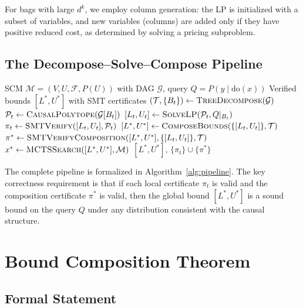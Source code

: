 \documentclass[11pt,a4paper]{article}
\newcommand{\doOp}{\mathrm{do}}
\newcommand{\calG}{\mathcal{G}}
\newcommand{\calM}{\mathcal{M}}
\newcommand{\calP}{\mathcal{P}}
\newcommand{\calT}{\mathcal{T}}
\begin{document}
For bags with large $d^k$, we employ column generation: the LP is initialized with a subset of variables, and new variables (columns) are added only if they have positive reduced cost, as determined by solving a pricing subproblem.

\subsection{The Decompose--Solve--Compose Pipeline}
\label{sec:pipeline}

\begin{algorithm}[t]
\caption{Decompose--Solve--Compose Pipeline}
\label{alg:pipeline}
\begin{algorithmic}[1]
\REQUIRE SCM $\calM = (V, U, \mathcal{F}, P(U))$ with DAG $\calG$, query $Q = P(y \mid \doOp(x))$
\ENSURE Verified bounds $[L^*, U^*]$ with SMT certificates
\STATE $(\calT, \{B_t\}) \leftarrow \textsc{TreeDecompose}(\calG)$
\FOR{each bag $B_t$ in $\calT$}
    \STATE $\calP_t \leftarrow \textsc{CausalPolytope}(\calG[B_t])$
    \STATE $[L_t, U_t] \leftarrow \textsc{SolveLP}(\calP_t, Q|_{B_t})$
    \STATE $\pi_t \leftarrow \textsc{SMTVerify}([L_t, U_t], \calP_t)$
\ENDFOR
\STATE $[L^*, U^*] \leftarrow \textsc{ComposeBounds}(\{[L_t, U_t]\}, \calT)$
\STATE $\pi^* \leftarrow \textsc{SMTVerifyComposition}([L^*, U^*], \{[L_t, U_t]\}, \calT)$
\STATE $x^* \leftarrow \textsc{MCTSSearch}([L^*, U^*], \calM)$
\RETURN $[L^*, U^*]$, $\{\pi_t\} \cup \{\pi^*\}$
\end{algorithmic}
\end{algorithm}

The complete pipeline is formalized in Algorithm~\ref{alg:pipeline}. The key correctness requirement is that if each local certificate $\pi_t$ is valid and the composition certificate $\pi^*$ is valid, then the global bound $[L^*, U^*]$ is a sound bound on the query $Q$ under any distribution consistent with the causal structure.

\section{Bound Composition Theorem}
\label{sec:composition}

\subsection{Formal Statement}
\label{sec:comp-statement}
\end{document}
